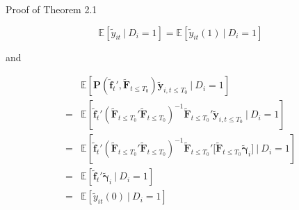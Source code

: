 \documentclass{beamer}
\newcommand{\1}{\mathds{1}} %
\newcommand{\condexpec}[2]{\mathbb{E}\left[#1 \ \vert \ #2\right]}
\begin{document}

\begin{frame}{Proof of Theorem 2.1}
\label{Theorem 2.1 proof}

\begin{equation*}
    \condexpec{\tilde{y}_{it}}{D_i = 1} = \condexpec{\tilde{y}_{it}(1)}{D_i = 1} 
\end{equation*}

and

\begin{align*}
    &\condexpec{ \bm P(\tilde{\bm f}_{t}', \tilde{\bm F}_{t \leq T_0}) \tilde{\bm y}_{i,t \leq T_0} }{D_i = 1} \\
    =& \condexpec{ \tilde{\bm f}_{t}' (\tilde{\bm F}_{t \leq T_0}' \tilde{\bm F}_{t \leq T_0})^{-1} \tilde{\bm F}_{t \leq T_0}' \tilde{\bm y}_{i,t \leq T_0} }{D_i = 1} \\
    =& \condexpec{ \tilde{\bm f}_{t}' (\tilde{\bm F}_{t \leq T_0}' \tilde{\bm F}_{t \leq T_0})^{-1} \tilde{\bm F}_{t \leq T_0}' \big[ \tilde{\bm F}_{t \leq T_0} \tilde{\bm \gamma}_i  \big] }{D_i = 1} \\
    =& \condexpec{ \tilde{\bm f}_{t}' \tilde{\bm \gamma}_i}{D_i = 1} \\
    =& \condexpec{ \tilde{y}_{it}(0) }{D_i = 1} 
\end{align*}

\hyperlink{Theorem 2.1 proof back}{}
\end{frame}
\end{document}
